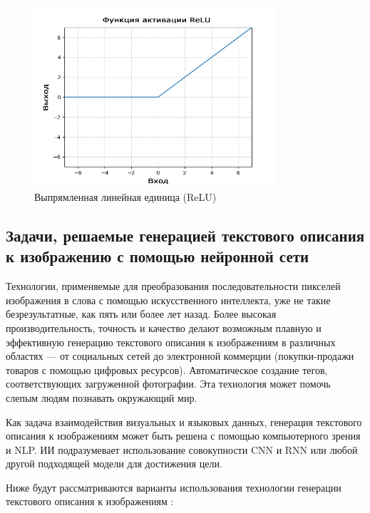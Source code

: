 \documentclass[bachelor, och, coursework]{SCWorks}
\begin{document}
        \begin{figure}[H]
            \centering
            \includegraphics[width=0.8\textwidth]{pics/ReLU.png}
            \caption{Выпрямленная линейная единица (ReLU) \cite{relu3}}
        \end{figure}

    \subsection{Задачи, решаемые генерацией текстового описания к изображению с помощью нейронной сети}

        Технологии, применяемые для преобразования последовательности пикселей
        изображения в слова с помощью искусственного интеллекта, уже не такие
        безрезультатные, как пять или более лет назад. Более высокая
        производительность, точность и качество делают возможным плавную и
        эффективную генерацию текстового описания к изображениям в различных
        областях — от социальных сетей до электронной коммерции (покупки-продажи
        товаров с помощью цифровых ресурсов). Автоматическое создание тегов,
        соответствующих загруженной фотографии. Эта технология может помочь
        слепым людям познавать окружающий мир.
        
        Как задача взаимодействия визуальных и языковых данных, генерация
        текстового описания к изображениям может быть решена с помощью
        компьютерного зрения и NLP. ИИ подразумевает использование совокупности
        CNN и RNN или любой другой подходящей модели для достижения цели.

        Ниже будут рассматриваются варианты использования технологии генерации
        текстового описания к изображениям \cite{applications}:
\end{document}
